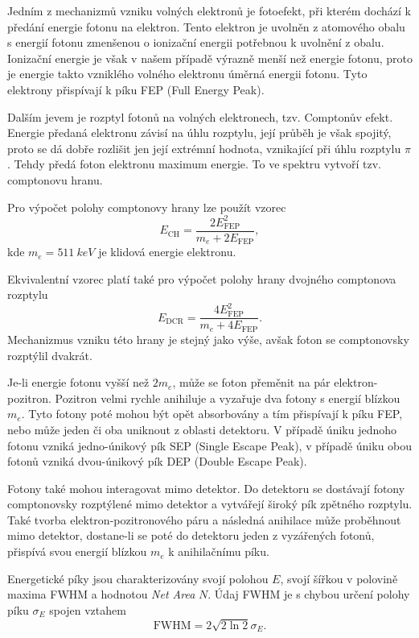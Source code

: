 \documentclass{protokol}
\begin{document}
    Jedním z mechanizmů vzniku volných elektronů je fotoefekt, při kterém dochází k předání energie fotonu na elektron. Tento elektron je uvolněn z atomového obalu s energií fotonu zmenšenou o ionizační energii potřebnou k uvolnění z obalu. Ionizační energie je však v našem případě výrazně menší než energie fotonu, proto je energie takto vzniklého volného elektronu úměrná energii fotonu. Tyto elektrony přispívají k píku FEP (Full Energy Peak).

    Dalším jevem je rozptyl fotonů na volných elektronech, tzv. Comptonův efekt. Energie předaná elektronu závisí na úhlu rozptylu, její průběh je však spojitý, proto se dá dobře rozlišit jen její extrémní hodnota, vznikající při úhlu rozptylu $\pi$. Tehdy předá foton elektronu maximum energie. To ve spektru vytvoří tzv. comptonovu hranu.

    Pro výpočet polohy comptonovy hrany lze použít vzorec
    \begin{equation} \label{eq:CH}
      E_\text{CH} = \frac{2E_\text{FEP}^2}{m_e + 2 E_\text{FEP}},
    \end{equation}
    kde $m_e = \SI{511}{keV}$ je klidová energie elektronu.

    Ekvivalentní vzorec platí také pro výpočet polohy hrany dvojného comptonova rozptylu
    \begin{equation} \label{eq:DCR}
      E_\text{DCR} = \frac{4E_\text{FEP}^2}{m_e + 4 E_\text{FEP}}.
    \end{equation}
    Mechanizmus vzniku této hrany je stejný jako výše, avšak foton se comptonovsky rozptýlil dvakrát.

    Je-li energie fotonu vyšší než $2 m_e$, může se foton přeměnit na pár elektron-pozitron. Pozitron velmi rychle anihiluje a vyzařuje dva fotony s energií blízkou $m_e$. Tyto fotony poté mohou být opět absorbovány a tím přispívají k píku FEP, nebo může jeden či oba uniknout z oblasti detektoru. V případě úniku jednoho fotonu vzniká jedno-únikový pík SEP (Single Escape Peak), v případě úniku obou fotonů vzniká dvou-únikový pík DEP (Double Escape Peak).

    Fotony také mohou interagovat mimo detektor. Do detektoru se dostávají fotony comptonovsky rozptýlené mimo detektor a vytvářejí široký pík zpětného rozptylu. Také tvorba elektron-pozitronového páru a následná anihilace může proběhnout mimo detektor, dostane-li se poté do detektoru jeden z vyzářených fotonů, přispívá svou energií blízkou $m_e$ k anihilačnímu píku.

    Energetické píky jsou charakterizovány svojí polohou $E$, svojí šířkou v polovině maxima FWHM a hodnotou \textit{Net Area} $N$. Údaj FWHM je s chybou určení polohy píku $\sigma_E$ spojen vztahem 
    \begin{equation} \label{eq:FWHM}
      \text{FWHM} = 2 \sqrt{2 \ln 2} \sigma_E.
    \end{equation}
\end{document}
